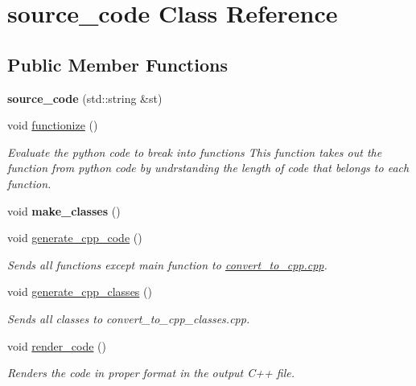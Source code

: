 \hypertarget{classsource__code}{}\section{source\+\_\+code Class Reference}
\label{classsource__code}
\subsection*{Public Member Functions}
\begin{DoxyCompactItemize}
\item 
{\bfseries source\+\_\+code} (std\+::string \&st)\hypertarget{classsource__code_abaa948e56e2fcd50d4ce693f724d8687}{}\label{classsource__code_abaa948e56e2fcd50d4ce693f724d8687}

\item 
void \hyperlink{classsource__code_aa728639debb35735e26b6263640af582}{functionize} ()
\begin{DoxyCompactList}\small\item\em Evaluate the python code to break into functions This function takes out the function from python code by undrstanding the length of code that belongs to each function. \end{DoxyCompactList}\item 
void {\bfseries make\+\_\+classes} ()\hypertarget{classsource__code_a3738fc644f820ae38c544b7a07b34141}{}\label{classsource__code_a3738fc644f820ae38c544b7a07b34141}

\item 
void \hyperlink{classsource__code_a2bef035b81554f6bf620603d561af9a7}{generate\+\_\+cpp\+\_\+code} ()
\begin{DoxyCompactList}\small\item\em Sends all functions except main function to \hyperlink{convert__to__cpp_8cpp}{convert\+\_\+to\+\_\+cpp.\+cpp}. \end{DoxyCompactList}\item 
void \hyperlink{classsource__code_a75aeef71dfeb0cdc150e7e4ef9f1cf51}{generate\+\_\+cpp\+\_\+classes} ()
\begin{DoxyCompactList}\small\item\em Sends all classes to convert\+\_\+to\+\_\+cpp\+\_\+classes.\+cpp. \end{DoxyCompactList}\item 
void \hyperlink{classsource__code_a5a9ae302faa54d8e263f1b5c5571f5b1}{render\+\_\+code} ()
\begin{DoxyCompactList}\small\item\em Renders the code in proper format in the output C++ file. \end{DoxyCompactList}\end{DoxyCompactItemize}
